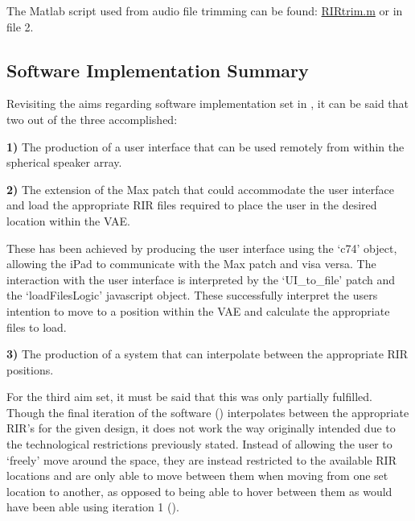 \documentclass[../../main.tex]{subfiles}
\begin{document}
		The Matlab script used from audio file trimming can be found: \href{http://lt669.github.io/code/matlab/html/RIRtrim.html}{RIRtrim.m} or in file 2.


		


	\subsection{Software Implementation Summary}

		Revisiting the aims regarding software implementation set in , it can be said that two out of the three accomplished:

		\textbf{1)} The production of a user interface that can be used remotely from within the spherical speaker array. 

		\textbf{2)} The extension of the Max patch that could accommodate the user interface and load the appropriate \ac{RIR} files required to place the user in the desired location within the \ac{VAE}. 

		These has been achieved by producing the user interface using the `c74' object, allowing the iPad to communicate with the Max patch and visa versa. The interaction with the user interface is interpreted by the `UI\_to\_file' patch and the `loadFilesLogic' javascript object. These successfully interpret the users intention to move to a position within the \ac{VAE} and calculate the appropriate files to load.
 
 		\textbf{3)} The production of a system that can interpolate between the appropriate \ac{RIR} positions.

 		For the third aim set, it must be said that this was only partially fulfilled. Though the final iteration of the software () interpolates between the appropriate \ac{RIR}'s for the given design, it does not work the way originally intended due to the technological restrictions previously stated. Instead of allowing the user to `freely' move around the space, they are instead restricted to the available \ac{RIR} locations and are only able to move between them when moving from one set location to another, as opposed to being able to hover between them as would have been able using iteration 1 ().
\end{document}

